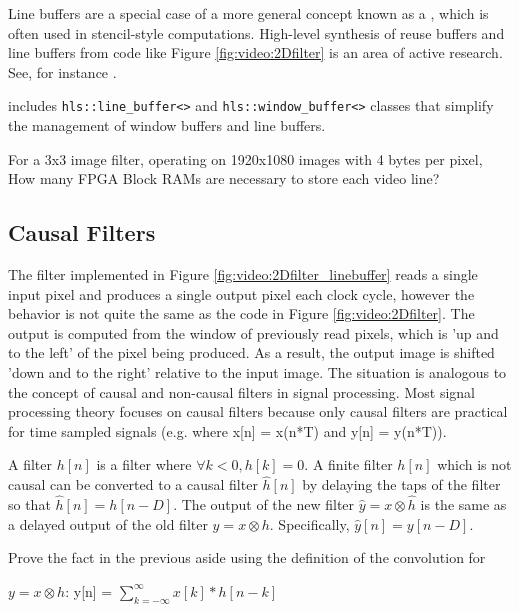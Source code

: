 \begin{aside}
Line buffers are a special case of a more general concept known as a , which is often used in stencil-style computations.  High-level synthesis of reuse buffers and line buffers from code like Figure \ref{fig:video:2Dfilter} is an area of active research.  See, for instance \cite{bayliss12sdram}\cite{hegarty2016rigel}.
\end{aside}
\begin{aside}
\VHLS includes \lstinline|hls::line_buffer<>| and \lstinline|hls::window_buffer<>| classes that simplify the management of window buffers and line buffers.  
\end{aside}

\begin{exercise}
For a 3x3 image filter, operating on 1920x1080 images with 4 bytes per pixel, How many FPGA Block RAMs are necessary to store each video line?
\end{exercise}

\subsection{Causal Filters}

The filter implemented in Figure \ref{fig:video:2Dfilter_linebuffer} reads a single input pixel and produces a single output pixel each clock cycle, however the behavior is not quite the same as the code in Figure \ref{fig:video:2Dfilter}.  The output is computed from the window of previously read pixels, which is 'up and to the left' of the pixel being produced. As a result, the output image is shifted 'down and to the right' relative to the input image.  The situation is analogous to the concept of causal and non-causal filters in signal processing.  Most signal processing theory focuses on causal filters because only causal filters are practical for time sampled signals (e.g. where x[n] = x(n*T) and y[n] = y(n*T)).

\begin{aside}
A  filter $h[n]$ is a filter where $\forall k < 0, h[k] = 0$.
A finite filter $h[n]$ which is not causal can be converted to a causal filter $\hat{h}[n]$ by delaying the taps of the filter so that $\hat{h}[n] = h[n-D]$. The output of the new filter $\hat{y} = x \otimes \hat{h}$ is the same as a delayed output of the old filter $y = x \otimes h$.  Specifically,  $\hat{y}[n] = y[n-D]$.
\end{aside}

\begin{exercise}
Prove the fact in the previous aside using the definition of the convolution for

$y = x \otimes h$: y[n] = $\sum\limits_{k=-\infty}^\infty x[k] *h[n-k]$
\end{exercise}

